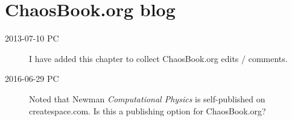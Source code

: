 

\chapter{ChaosBook.org blog}
\label{chap:LyapChaosBook}

\renewcommand{\ssp}{x}

\begin{description}

\item[2013-07-10 PC]
I have added this chapter to collect ChaosBook.org edits /
comments.

\item[2016-06-29 PC]              \toCB
Noted that Newman {\em Computational Physics} is
self-published on  {createspace.com}. Is this a
publishing option for ChaosBook.org?

\end{description}

%


%
%

